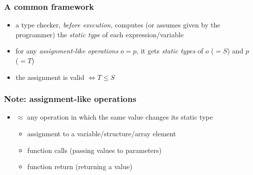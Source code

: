 \documentclass[12pt,dvipdfmx]{beamer}
\newcommand{\ao}[1]{{\color{blue}#1}}
\begin{document}
\begin{frame}
  \frametitle{A common framework}
  \begin{itemize}
  \item a type checker, {\it before execution}, 
    computes (or assumes given by the programmer)
    the \ao{\it static type} of each expression/variable
  \item for any \ao{\it assignment-like operations} $o = p$,
    it gets \ao{\it static types} of $o$ ($= S$) and $p$ ($= T$)
  \item the assignment is valid $\iff T \leq S$ 
  \end{itemize}
\end{frame}

\iffalse
\begin{frame}
  \frametitle{A common framework}
  \begin{itemize}
  \item we (i.e., static type checker) like to guarantee that,
    \begin{itemize}
    \item for any expression $E$ whose \ao{\it static type} is $S$,
    \item any value $E$ could take at runtime can be \ao{\it safely put} in anywhere $S$ is expected
      ($\approx$ any such value implements all the methods $S$ specifies)
    \end{itemize}
  \item for which we have to guarantee that,
    for any \ao{\it assignment-like operations} $o = p$,
    where $o$'s \ao{\it static type} is $S$, 
    any value $p$ could take at runtime can be \ao{\it safely put}
    in anywhere $S$ is expected
  \item we want to check it by $p$'s static type ($T$) and $o$'s static type ($S$)
  \item this is precisely what we like to capture by
    \ao{\it subtype} relationship ($T \leq S$)
  \end{itemize}
\end{frame}
\fi

\begin{frame}
  \frametitle{Note: assignment-like operations}
  \begin{itemize}
  \item  $\approx$ any operation in which the same value 
    changes its static type
    \begin{itemize}
    \item assignment to a variable/structure/array element
    \item function calls (passing values to parameters)
    \item function return (returning a value)
    \end{itemize}
  \end{itemize}
\end{frame}
\end{document}
